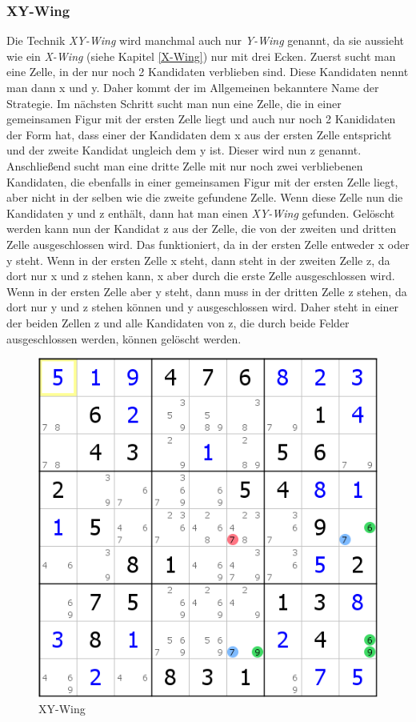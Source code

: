 \subsubsection{XY-Wing}
Die Technik \textit{XY-Wing} wird manchmal auch nur \textit{Y-Wing} genannt, da sie aussieht wie ein \textit{X-Wing} (siehe Kapitel \ref{X-Wing}) nur mit drei Ecken. Zuerst sucht man eine Zelle, in der nur noch 2 Kandidaten verblieben sind. Diese Kandidaten nennt man dann x und y. Daher kommt der im Allgemeinen bekanntere Name der Strategie. Im nächsten Schritt sucht man nun eine Zelle, die in einer gemeinsamen Figur mit der ersten Zelle liegt und auch nur noch 2 Kanididaten der Form hat, dass einer der Kandidaten dem x aus der ersten Zelle entspricht und der zweite Kandidat ungleich dem y ist. Dieser wird nun z genannt. Anschließend sucht man eine dritte Zelle mit nur noch zwei verbliebenen Kandidaten, die ebenfalls in einer gemeinsamen Figur mit der ersten Zelle liegt, aber nicht in der selben wie die zweite gefundene Zelle. Wenn diese Zelle nun die Kandidaten y und z enthält, dann hat man einen \textit{XY-Wing} gefunden. Gelöscht werden kann nun der Kandidat z aus der Zelle, die von der zweiten und dritten Zelle ausgeschlossen wird. Das funktioniert, da in der ersten Zelle entweder x oder y steht. Wenn in der ersten Zelle x steht, dann steht in der zweiten Zelle z, da dort nur x und z stehen kann, x aber durch die erste Zelle ausgeschlossen wird. Wenn in der ersten Zelle aber y steht, dann muss in der dritten Zelle z stehen, da dort nur y und z stehen können und y ausgeschlossen wird. Daher steht in einer der beiden Zellen z und alle Kandidaten von z, die durch beide Felder ausgeschlossen werden, können gelöscht werden.

\begin{figure}[h]
\begin{center}
\includegraphics{./img/XY_Wing.png}
\caption{XY-Wing}
\end{center}
\end{figure}

